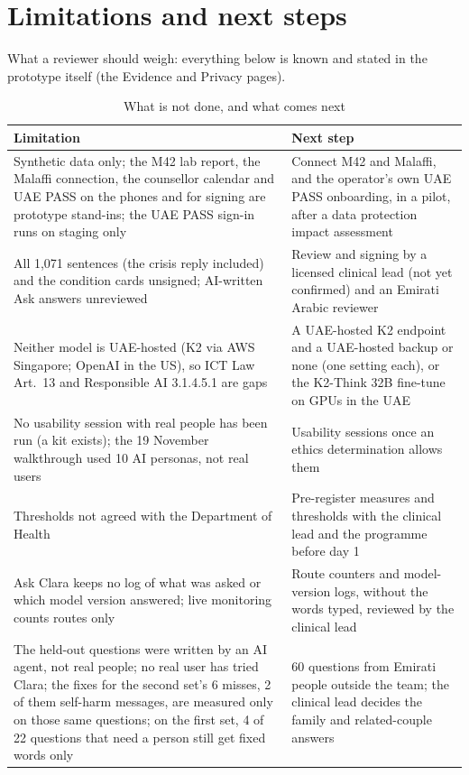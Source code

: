 \documentclass[10.5pt,a4paper]{article}
\newcommand{\chapterbreak}{}
\let\oldsection\section
\renewcommand{\section}{\chapterbreak\oldsection}
\newcommand{\thead}[1]{\textbf{#1}}
\newcommand{\toprl}{\arrayrulecolor{ink}\toprule\arrayrulecolor{rule}}
\begin{document}
\section{Limitations and next steps}

What a reviewer should weigh: everything below is known and stated in the prototype itself (the Evidence and Privacy pages).


{\small
\begin{xltabular}{\textwidth}{@{}LL@{}}
\caption{What is not done, and what comes next}\\
\toprl
\thead{Limitation} & \thead{Next step}\\
\midrule
Synthetic data only; the M42 lab report, the Malaffi connection, the counsellor calendar and UAE PASS on the phones and for signing are prototype stand-ins; the UAE PASS sign-in runs on staging only & Connect M42 and Malaffi, and the operator's own UAE PASS onboarding, in a pilot, after a data protection impact assessment\\
\midrule
All 1,071 sentences (the crisis reply included) and the condition cards unsigned; AI-written Ask answers unreviewed & Review and signing by a licensed clinical lead (not yet confirmed) and an Emirati Arabic reviewer\\
\midrule
Neither model is UAE-hosted (K2 via AWS Singapore; OpenAI in the US), so ICT Law Art.~13 and Responsible AI 3.1.4.5.1 are gaps & A UAE-hosted K2 endpoint and a UAE-hosted backup or none (one setting each), or the K2-Think 32B fine-tune on GPUs in the UAE\\
\midrule
No usability session with real people has been run (a kit exists); the 19 November walkthrough used 10 AI personas, not real users & Usability sessions once an ethics determination allows them\\
\midrule
Thresholds not agreed with the Department of Health & Pre-register measures and thresholds with the clinical lead and the programme before day 1\\
\midrule
Ask Clara keeps no log of what was asked or which model version answered; live monitoring counts routes only & Route counters and model-version logs, without the words typed, reviewed by the clinical lead\\
\midrule
The held-out questions were written by an AI agent, not real people; no real user has tried Clara; the fixes for the second set's 6 misses, 2 of them self-harm messages, are measured only on those same questions; on the first set, 4 of 22 questions that need a person still get fixed words only & 60 questions from Emirati people outside the team; the clinical lead decides the family and related-couple answers\\

\end{xltabular}}
\end{document}
